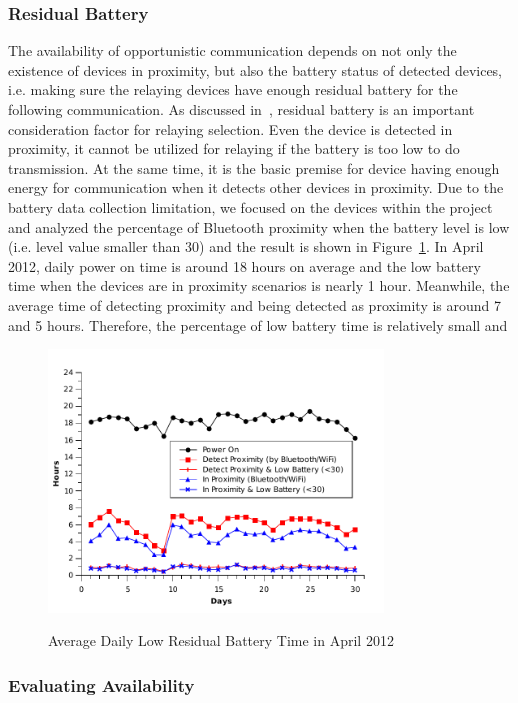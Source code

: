 \subsubsection{Residual Battery}
The availability of opportunistic communication depends on not only the existence of devices in proximity, but also the battery status of detected devices, i.e. making sure the relaying devices have enough residual battery for the following communication. As discussed in~\cite{zou2012exploiting, madan2008energy}, residual battery is an important consideration factor for relaying selection. Even the device is detected in proximity, it cannot be utilized for relaying if the battery is too low to do transmission. At the same time, it is the basic premise for device having enough energy for communication when it detects other devices in proximity. 
Due to the battery data collection limitation, we focused on the devices within the project and analyzed the percentage of Bluetooth proximity when the battery level is low (i.e. level value smaller than 30) and the result is shown in Figure~\ref{fig:battery}. In April 2012, daily power on time is around 18 hours on average and the low battery time when the devices are in proximity scenarios is nearly 1 hour. Meanwhile, the average time of detecting proximity and being detected as proximity is around 7 and 5 hours. Therefore, the percentage of low battery time is relatively small and 

\begin{figure}[tbp]
\centering 
{\includegraphics[width=3.5in]{graphs/battery.pdf}}
\caption{Average Daily Low Residual Battery Time in April 2012} 
\label{fig:battery}
\end{figure} 

\subsubsection{Evaluating Availability} 


